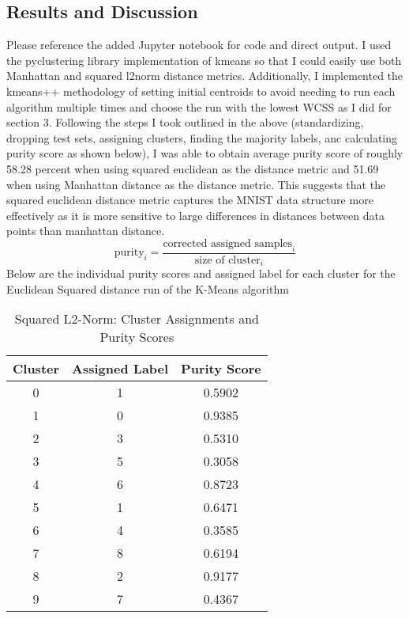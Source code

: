 \documentclass{article}
\begin{document}
\subsection{Results and Discussion}
Please reference the added Jupyter notebook for code and direct output. I used the pyclustering library
implementation of kmeans so that I could easily use both Manhattan and squared l2norm distance metrics.
Additionally, I implemented the kmeans++ methodology of setting initial centroids to avoid needing to run each
algorithm multiple times and choose the run with the lowest WCSS as I did for section 3. Following the steps
I took outlined in the above (standardizing, dropping test sets, assigning clusters, finding the majority
labels, anc calculating purity score as shown below), I was able to obtain average purity score of roughly 58.28
percent when using squared euclidean as the distance metric and 51.69 when using Manhattan distance as the distance
metric. This suggests that the squared euclidean distance metric captures the MNIST data structure more effectively
as it is more sensitive to large differences in distances between data points than manhattan distance.
\begin{equation}
\mbox{purity}_i = \frac{\mbox{corrected assigned samples}_i}{\mbox{size of cluster}_i}
\end{equation}
Below are the individual purity scores and assigned label for each cluster for the Euclidean Squared distance
run of the K-Means algorithm

\begin{table}[h!]
\centering
\begin{tabular}{|c|c|c|}
\hline
\textbf{Cluster} & \textbf{Assigned Label} & \textbf{Purity Score} \\
\hline
0 & 1 & 0.5902 \\
1 & 0 & 0.9385 \\
2 & 3 & 0.5310 \\
3 & 5 & 0.3058 \\
4 & 6 & 0.8723 \\
5 & 1 & 0.6471 \\
6 & 4 & 0.3585 \\
7 & 8 & 0.6194 \\
8 & 2 & 0.9177 \\
9 & 7 & 0.4367 \\
\hline
\end{tabular}
\caption{Squared L2-Norm: Cluster Assignments and Purity Scores}
\end{table}
\end{document}
